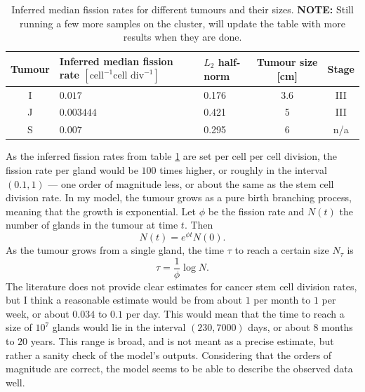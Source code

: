 \begin{table}[ht]
    \centering
    \begin{tabularx}{\textwidth}{|c|X|X|c|c|}
    \hline
    Tumour & Inferred median fission rate $[\text{cell}^{-1}\text{cell div}^{-1}]$ & $L_2$ half-norm & Tumour size [cm] & Stage \\
    \hline
    I & $0.017$ & 0.176 & 3.6 & III \\
    \hline
    J & $0.003444$ & 0.421 & 5 & III \\
    \hline
    S & $0.007$ & 0.295 & 6 & n/a \\
    \hline
    \end{tabularx}
    \caption{Inferred median fission rates for different tumours and their
    sizes. \textbf{NOTE:} Still running a few more samples on the cluster, will
    update the table with more results when they are done.}
    \label{tab:fission_rates}
\end{table}

As the inferred fission rates from table \ref{tab:fission_rates} are set per
cell per cell division, the fission rate per gland would be $100$ times higher,
or roughly in the interval $(0.1, 1)$ --- one order of magnitude less, or about
the same as the stem cell division rate. In my model, the tumour grows as a pure
birth branching process, meaning that the growth is exponential. Let $\phi$ be
the fission rate and $N(t)$ the number of glands in the tumour at time $t$. Then
\begin{equation}
    N(t) = e^{\phi t}N(0).
\end{equation}
As the tumour grows from a single gland, the time $\tau$ to reach a certain
size $N_\tau$ is
\begin{equation}
    \tau = \frac{1}{\phi}\log N.
\end{equation}
The literature does not provide clear estimates for cancer stem cell division
rates, but I think a reasonable estimate would be from about $1$ per month to
$1$ per week, or about $0.034$ to $0.1$ per day. This would mean that the time
to reach a size of $10^7$ glands would lie in the interval $(230, 7000)$ days,
or about $8$ months to $20$ years. This range is broad, and is not meant as a
precise estimate, but rather a sanity check of the model's outputs. Considering
that the orders of magnitude are correct, the model seems to be able to describe
the observed data well.

